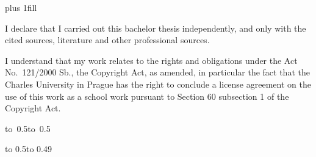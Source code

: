 \openright

\noindent
\Dedication

\newpage


\vglue 0pt plus 1fill

\noindent
I declare that I carried out this bachelor thesis independently, and only with the cited
sources, literature and other professional sources.

\medskip\noindent
I understand that my work relates to the rights and obligations under the Act No.~121/2000 Sb.,
the Copyright Act, as amended, in particular the fact that the Charles
University in Prague has the right to conclude a license agreement on the use of this
work as a school work pursuant to Section 60 subsection 1 of the Copyright Act.

\vspace{10mm}

\hbox{\hbox to 0.5\hbox to 0.5}

\vspace{20mm}
\newpage


\vbox to 0.5\nobreak\vbox to 0.49

\newpage
\hypersetup{pageanchor=true}
